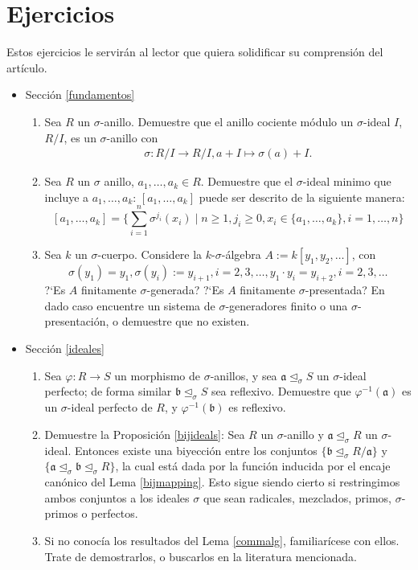 \documentclass[letterpaper]{article}
\def\a{\mathfrak{a}}
\def\b{\mathfrak{b}}
\def\s{\sigma}
\def\si{\unlhd_{\sigma}}
\theoremstyle{definition}
\begin{document}
\section*{Ejercicios}
Estos ejercicios le servir\'an al lector que quiera solidificar su comprensi\'on del art\'iculo. 
\begin{itemize}
\item Secci\'on \ref{fundamentos}
  \begin{enumerate}
  \item Sea $R$ un $\s$-anillo. Demuestre que el anillo cociente m\'odulo un $\s$-ideal $I$, $R/I$, es un $\s$-anillo con
 \begin{align*} \sigma: R/I \rightarrow R/I, a + I \mapsto \sigma(a) + I. \end{align*}
 \item Sea $R$ un $\s$ anillo, $a_1,\ldots,a_k \in R$. Demuestre que el $\s$-ideal minimo que incluye a $a_1,\ldots,a_k$: $[a_1,\ldots,a_k]$ puede ser descrito de la siguiente manera:
  \[[a_1,\ldots,a_k] = \{ \sum_{i=1}^n \s^{j_i}(x_i) \mid n \geq 1, j_i \geq 0, x_i \in \{a_1,\ldots,a_k\}, i=1,\ldots,n \} \]
\item Sea $k$ un $\s$-cuerpo. Considere la  $k$-$\s$-\'algebra $A:= k[y_1,y_2,\ldots]$, con \[ \s(y_1) = y_1, \s(y_i) := y_{i+1}, i = 2,3, \ldots, y_1 \cdot y_i = y_{i+2}, i = 2,3, \ldots \]
?`Es $A$ finitamente $\s$-generada? ?`Es $A$ finitamente $\s$-presentada? En dado caso encuentre un sistema de $\s$-generadores finito o una $\s$-presentaci\'on, o demuestre que no existen.
  \end{enumerate}
\item Secci\'on \ref{ideales}
  \begin{enumerate}
  \item Sea $\varphi: R \rightarrow S$ un morphismo de $\s$-anillos, y sea $\a \si S$ un $\s$-ideal perfecto; de forma similar $\b \si S$ sea reflexivo.
    Demuestre que $\varphi^{-1}(\a)$ es un $\s$-ideal perfecto de $R$, y $\varphi^{-1}(\b)$ es reflexivo.
  \item Demuestre la Proposici\'on \ref{bijideals}: Sea $R$ un $\sigma$-anillo y $\a \si R$ un $\sigma$-ideal. Entonces existe una biyecci\'on entre los conjuntos $\{ \b \si R/\a \}$ y $\{ \a \si \b \si R \}$, la cual est\'a dada por la funci\'on inducida por el encaje can\'onico del Lema \ref{bijmapping}. 
Esto sigue siendo cierto si restringimos ambos conjuntos a los ideales $\s$ que sean radicales, mezclados, primos, $\sigma$-primos o perfectos.
\item Si no conoc\'ia los resultados del Lema \ref{commalg}, familiar\'icese con ellos. Trate de demostrarlos, o buscarlos en la literatura mencionada.

\end{enumerate}
\end{itemize}
\end{document}
